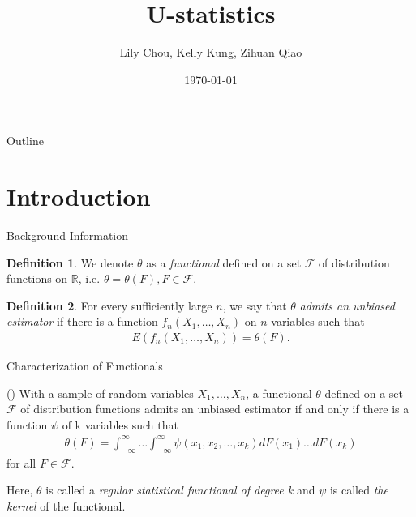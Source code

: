\documentclass{beamer}
\title{U-statistics}
\author{Lily Chou, Kelly Kung, Zihuan Qiao}
\institute{Probability Theory II}
\date{\today}
\newcommand{\R}{{\mathbb{R}}}
\theoremstyle{definition}
\newtheorem{Def}{Definition}
\numberwithin{Def}{section}
\begin{document}
\begin{frame}
  \titlepage
\end{frame}

\begin{frame}{Outline}
  \tableofcontents
\end{frame}

\section{Introduction}
\begin{frame}{Background Information}
\begin{Def}{}
We denote $\theta$ as a \textit{functional} defined on a set $\mathcal{F}$ of distribution functions on $\R$, i.e. $\theta = \theta(F), F \in \mathcal{F}$.
\end{Def}

\begin{Def}{}
For every sufficiently large $n$, we say that $\theta$ \textit{admits an unbiased estimator} if there is a function $f_n(X_1, \dotsc, X_n)$ on $n$ variables such that \begin{align}\label{unbiased} E(f_n(X_1, \dotsc, X_n)) = \theta(F).\end{align}
\end{Def}
\end{frame}

\begin{frame}{Characterization of Functionals}

  \begin{theorem}
(\cite{halmos1946theory}) With a sample of random variables $X_1, \dotsc, X_n$, a functional $\theta$ defined on a set $\mathcal{F}$ of distribution functions admits an unbiased estimator if and only if there is a function $\psi$ of k variables such that 
\begin{align}\label{unbiased_est}
    \theta(F) = \int_{-\infty}^{\infty} \dotsc \int_{-\infty}^{\infty} \psi(x_1, x_2, \dotsc, x_k)dF(x_1) \dotsc dF(x_k)
\end{align}
for all $F \in \mathcal{F}$.
\end{theorem}
    Here, $\theta$ is called a \textit{regular statistical functional of degree k} and $\psi$ is called \textit{the kernel} of the functional. 
 
\end{frame}
\end{document}
